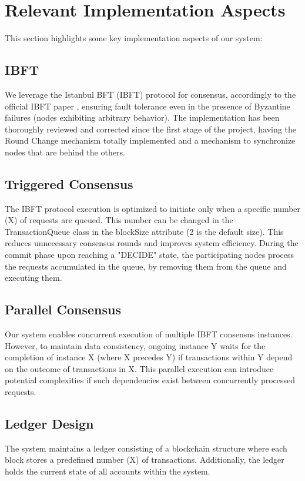 \section{Relevant Implementation Aspects}

This section highlights some key implementation aspects of our system:

\subsection{IBFT}
We leverage the Istanbul BFT (IBFT) protocol for consensus, accordingly to the official IBFT paper \cite{ibft-paper}, ensuring fault tolerance even in the presence of Byzantine failures (nodes exhibiting arbitrary behavior). The implementation has been thoroughly reviewed and corrected since the first stage of the project, having the Round Change mechanism totally implemented and a mechanism to synchronize nodes that are behind the others.

\subsection{Triggered Consensus}
The IBFT protocol execution is optimized to initiate only when a specific number (X) of requests are queued. This number can be changed in the TransactionQueue class in the blockSize attribute (2 is the default size). This reduces unnecessary consensus rounds and improves system efficiency. During the commit phase upon reaching a "DECIDE" state, the participating nodes process the requests accumulated in the queue, by removing them from the queue and executing them.

\subsection{Parallel Consensus}
Our system enables concurrent execution of multiple IBFT consensus instances. However, to maintain data consistency, ongoing instance Y waits for the completion of instance X (where X precedes Y) if transactions within Y depend on the outcome of transactions in X. This parallel execution can introduce potential complexities if such dependencies exist between concurrently processed requests. 

\subsection{Ledger Design}
The system maintains a ledger consisting of a blockchain structure where each block stores a predefined number (X) of transactions. Additionally, the ledger holds the current state of all accounts within the system.

